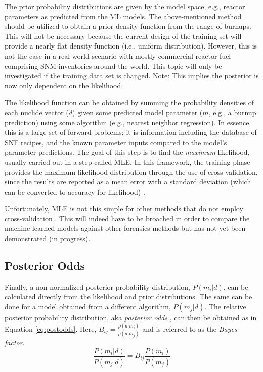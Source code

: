 The prior probability distributions are given by the model space, e.g., reactor
parameters as predicted from the \gls{ML} models.  The above-mentioned
method should be utilized to obtain a prior density function from the range of
burnups.  This will not be necessary because the current design of the training
set will provide a nearly flat density function (i.e., uniform distribution).
However, this is not the case in a real-world scenario with mostly commercial
reactor fuel comprising \gls{SNM} inventories around the world.  This topic
will only be investigated if the training data set is changed.
\cite{bayes_compare} Note: This implies the posterior is now only dependent on
the likelihood.

The likelihood function can be obtained by summing the probability densities of
each nuclide vector ($d$) given some predicted model parameter ($m$, e.g., a
burnup prediction) using some algorithm (e.g., nearest neighbor regression).
In essence, this is a large set of forward problems; it is information
including the database of \gls{SNF} recipes, and the known parameter inputs
compared to the model's parameter predictions.  The goal of this step is to
find the \textit{maximum} likelihood, usually carried out in a step called
\gls{MLE}. In this framework, the training phase provides the maximum
likelihood distribution through the use of cross-validation, since the results
are reported as a mean error with a standard deviation (which can be
converted to accuracy for likelihood) \cite{scikit}. 

Unfortunately, \gls{MLE} is not this simple for other methods that do not
employ cross-validation \cite{gentle_bayes, bayes_compare}. This will indeed
have to be broached in order to compare the machine-learned models against
other forensics methods but has not yet been demonstrated (in progress).

\subsection{Posterior Odds}

Finally, a non-normalized posterior probability distribution, $P(m_i|d)$, can
be calculated directly from the likelihood and prior distributions. The same
can be done for a model obtained from a different algorithm, $P(m_j|d)$. The
relative posterior probability distribution, aka \textit{posterior odds}
\cite{bayes_compare}, can then be obtained as in Equation \ref{eq:postodds}.
Here, $B_{ij} = \frac{\rho(d|m_i)}{\rho(d|m_j)}$ and is referred to as the
\textit{Bayes factor}.
\begin{equation}
\label{eq:postodds}
  \frac{P(m_i|d)}{P(m_j|d)} = B_{ij} \frac{P(m_i)}{P(m_j)}
\end{equation}

